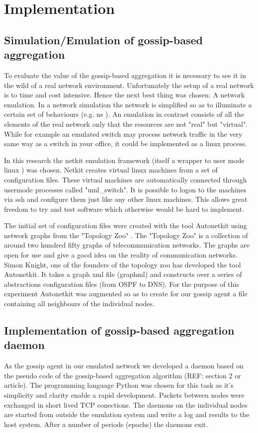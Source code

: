\documentclass[11pt,a4paper]{article}
\begin{document}
\section{Implementation}
\subsection{Simulation/Emulation of gossip-based aggregation}
To evaluate the value of the gossip-based aggregation it is necessary to see it in the wild of a real network environment. Unfortunately the setup of a real network is to time and cost intensive. Hence the next best thing was chosen: A network emulation. In a network simulation the network is simplified so as to illuminate a certain set of behaviours (e.g. ns \cite{ns}). An emulation in contrast consists of all the elements of the real network only that the resources are not "real" but "virtual". While for example an emulated switch may process network traffic in the very same way as a switch in your office, it could be implemented as a linux process.

In this research the netkit emulation framework (itself a wrapper to user mode linux \cite{uml}) was chosen. Netkit \cite{netkit} creates virtual linux machines from a set of configuration files. These virtual machines are automatically connected through usermode processes called "uml\_switch". It is possible to logon to the machines via ssh and configure them just like any other linux machines. This allows great freedom to try and test software which otherwise would be hard to implement.

The initial set of configuration files were created with the tool Autonetkit \cite{autonetkit} using network graphs from the "Topology Zoo" \cite{knight_internet_2011}. The "Topology Zoo" is a collection of around two hundred fifty graphs of telecommunication networks. The graphs are open for use and give a good idea on the reality of communication networks. Simon Knight, one of the founders of the topology zoo has developed the tool Autonetkit. It takes a graph xml file (graphml) and constructs over a series of abstractions configuration files (from OSPF to DNS). For the purpose of this experiment Autonetkit was augmented so as to create for our gossip agent a file containing all neighbours of the individual nodes.

\subsection{Implementation of gossip-based aggregation daemon}
As the gossip agent in our emulated network we developed a daemon based on the pseudo code of the gossip-based aggregation algorithm (REF: section 2 or article). The programming language Python \cite{python} was chosen for this task as it's simplicity and clarity enable a rapid development. Packets between nodes were exchanged in short lived TCP conections. The daemons on the individual nodes are started from outside the emulation system and write a log and results to the host system. After a number of periods (epochs) the daemons exit.
\end{document}

